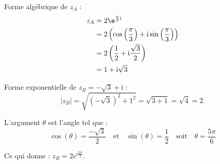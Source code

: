 \medskip

Forme algébrique de $z_A$ :
\begin{align*}
z_A &= 2\e^{\frac{\pi}{3}\text{i}} \\
&= 2 \left( \cos\left(\dfrac{\pi}{3}\right) + \text{i}\sin\left(\dfrac{\pi}{3}\right) \right) \\
&= 2 \left( \dfrac{1}{2} + \text{i}\dfrac{\sqrt{3}}{2} \right) \\
&= 1 + \text{i}\sqrt{3}
\end{align*}

Forme exponentielle de $z_B = -\sqrt{3} + \text{i}$ :
\[\left|z_B\right| = \sqrt{\left(-\sqrt{3}\right)^2 + 1^2} = \sqrt{3 + 1} = \sqrt{4} = 2.\]

L'argument $\theta$ est l’angle tel que :
\[\cos(\theta) = \frac{-\sqrt{3}}{2} \quad \text{et} \quad \sin(\theta) = \frac{1}{2} \quad \text{soit} \quad \theta = \dfrac{5\pi}{6}\]

Ce qui donne : $z_B = 2e^{\text{i}\frac{2\pi}{3}}$.

\bigskip
